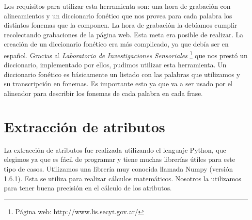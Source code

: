 Los requisitos para utilizar esta herramienta son: una hora de grabación con alineamientos y un diccionario fonético que nos provea para cada palabra los distintos fonemas que la componen. La hora de grabación la debíamos cumplir recolectando grabaciones de la página web. Esta meta era posible de realizar. La creación de un diccionario fonético era más complicado, ya que debía ser en español. Gracias al \textit{Laboratorio de Investigaciones Sensoriales} \footnote{Página web: http://www.lis.secyt.gov.ar/} que nos prestó un diccionario, implementado por ellos, pudimos utilizar esta herramienta. Un diccionario fonético es básicamente un listado con las palabras que utilizamos y su transcripción en fonemas. Es importante esto ya que va a ser usado por el alineador para describir los fonemas de cada palabra en cada frase.



\section{Extracción de atributos}

La extracción de atributos fue realizada utilizando el lenguaje Python, que elegimos ya que es fácil de programar y tiene muchas librerías útiles para este tipo de casos. Utilizamos una librería muy conocida llamada Numpy (versión 1.6.1). Esta se utiliza para realizar cálculos matemáticos. Nosotros la utilizamos para tener buena precisión en el cálculo de los atributos.

